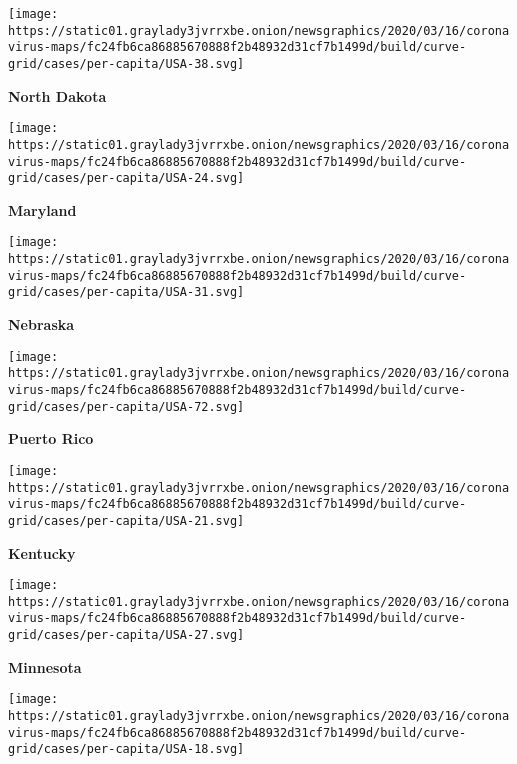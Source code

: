 \texttt{[image: https://static01.graylady3jvrrxbe.onion/newsgraphics/2020/03/16/coronavirus-maps/fc24fb6ca86885670888f2b48932d31cf7b1499d/build/curve-grid/cases/per-capita/USA-38.svg]}

\textbf{North Dakota}

\href{https://www.nytimes3xbfgragh.onion/interactive/2020/us/maryland-coronavirus-cases.html}{}

\texttt{[image: https://static01.graylady3jvrrxbe.onion/newsgraphics/2020/03/16/coronavirus-maps/fc24fb6ca86885670888f2b48932d31cf7b1499d/build/curve-grid/cases/per-capita/USA-24.svg]}

\textbf{Maryland}

\href{https://www.nytimes3xbfgragh.onion/interactive/2020/us/nebraska-coronavirus-cases.html}{}

\texttt{[image: https://static01.graylady3jvrrxbe.onion/newsgraphics/2020/03/16/coronavirus-maps/fc24fb6ca86885670888f2b48932d31cf7b1499d/build/curve-grid/cases/per-capita/USA-31.svg]}

\textbf{Nebraska}

\href{https://www.nytimes3xbfgragh.onion/interactive/2020/us/puerto-rico-coronavirus-cases.html}{}

\texttt{[image: https://static01.graylady3jvrrxbe.onion/newsgraphics/2020/03/16/coronavirus-maps/fc24fb6ca86885670888f2b48932d31cf7b1499d/build/curve-grid/cases/per-capita/USA-72.svg]}

\textbf{Puerto Rico}

\href{https://www.nytimes3xbfgragh.onion/interactive/2020/us/kentucky-coronavirus-cases.html}{}

\texttt{[image: https://static01.graylady3jvrrxbe.onion/newsgraphics/2020/03/16/coronavirus-maps/fc24fb6ca86885670888f2b48932d31cf7b1499d/build/curve-grid/cases/per-capita/USA-21.svg]}

\textbf{Kentucky}

\href{https://www.nytimes3xbfgragh.onion/interactive/2020/us/minnesota-coronavirus-cases.html}{}

\texttt{[image: https://static01.graylady3jvrrxbe.onion/newsgraphics/2020/03/16/coronavirus-maps/fc24fb6ca86885670888f2b48932d31cf7b1499d/build/curve-grid/cases/per-capita/USA-27.svg]}

\textbf{Minnesota}

\href{https://www.nytimes3xbfgragh.onion/interactive/2020/us/indiana-coronavirus-cases.html}{}

\texttt{[image: https://static01.graylady3jvrrxbe.onion/newsgraphics/2020/03/16/coronavirus-maps/fc24fb6ca86885670888f2b48932d31cf7b1499d/build/curve-grid/cases/per-capita/USA-18.svg]}

